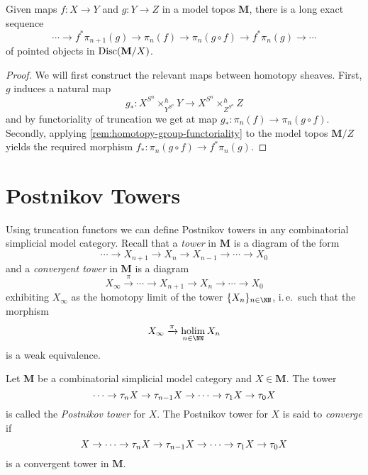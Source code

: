 \begin{proposition}
  Given maps \(f\colon X\to Y\) and \(g\colon Y\to Z\) in a model topos \(\mathbf M\), there is a long exact sequence
  \[
  \cdots \to f^{*}\pi_{n+1}(g) \to \pi_{n}(f) \to \pi_{n}(g\circ f) \to f^{*}\pi_{n}(g) \to \cdots
  \]
  of pointed objects in \(\operatorname{\textnormal{Disc}}(\mathbf M/X)\).
\end{proposition}
\begin{proof}
  We will first construct the relevant maps between homotopy sheaves. First, \(g\) induces a natural map
  \[g_{*}\colon X^{S^{n}}\times^{h}_{Y^{S^{n}}} Y\to X^{S^{n}}\times^{h}_{Z^{S^{n}}} Z\]
  and by functoriality of truncation we get at map \(g_{*}\colon \pi_{n}(f)\to\pi_{n}(g\circ f)\). Secondly, applying \autoref{rem:homotopy-group-functoriality} to the model topos \(\mathbf M/Z\) yields the required morphism \(f_{*}\colon \pi_{n}(g\circ f)\to f^{*}\pi_{n}(g)\).
\end{proof}


\section{Postnikov Towers}

Using truncation functors we can define Postnikov towers in any combinatorial simplicial model category. Recall that a \emph{tower} in \(\mathbf M\) is a diagram of the form
\[\cdots \to X_{n+1}\to X_{n}\to X_{n-1}\to \cdots \to X_{0} \]
and a \emph{convergent tower} in \(\mathbf M\) is a diagram
\[X_{\infty}\xrightarrow{\pi} \cdots \to X_{n+1}\to X_{n}\to\cdots\to X_{0}\]
exhibiting \(X_{\infty}\) as the homotopy limit of the tower \(\{X_{n}\}_{n\in\NN}\), i.\,e.~such that the morphism
\[X_{\infty}\xrightarrow{\pi}\holim_{n\in\NN} X_{n}\]
is a weak equivalence.

\begin{definition}
  Let \(\mathbf M\) be a combinatorial simplicial model category and \(X\in\mathbf M\). The tower
  \[\cdots\to\tau_{n} X\to\tau_{n-1} X\to\cdots\to\tau_{1} X\to\tau_{0}X\]
  is called the \emph{Postnikov tower} for \(X\). The Postnikov tower for \(X\) is said to \emph{converge} if
  \[X\to\cdots\to\tau_{n} X\to\tau_{n-1} X\to\cdots\to\tau_{1} X\to\tau_{0}X\]
  is a convergent tower in \(\mathbf M\).
\end{definition}

\printbibliography

\listoftodos
